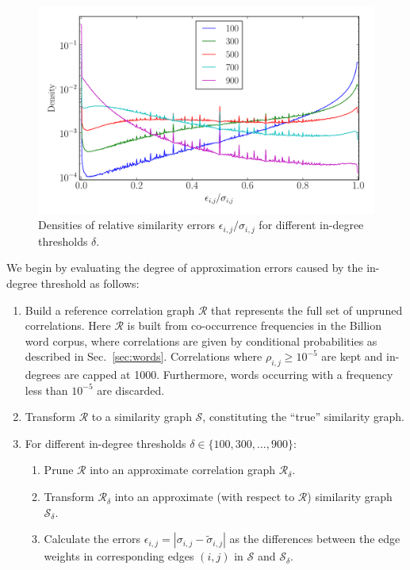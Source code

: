 \documentclass{kais}
\begin{document}
\begin{figure}
\centerline{\includegraphics[width=0.75\columnwidth]{figures/1446451652-relative_error.pdf}}
\caption{Densities of relative similarity errors $\epsilon_{i,j}/\sigma_{i,j}$ for different 
in-degree thresholds $\delta$.}
\label{fig:rel-error}
\end{figure}

We begin by evaluating the degree of approximation errors caused by the in-degree threshold as follows:

\begin{enumerate}
\item Build a reference correlation graph $\mathcal{R}$ that represents the full set of unpruned correlations. 
Here $\mathcal{R}$ is built from co-occurrence frequencies in the Billion word corpus, 
where correlations are given by conditional probabilities as described in Sec.\ \ref{sec:words}.
Correlations where $\rho_{i,j} \geq 10^{-5}$ are kept and in-degrees are capped at 1000.
Furthermore, words occurring with a frequency less than $10^{-5}$ are discarded.
\item Transform $\mathcal{R}$ to a similarity graph $\mathcal{S}$, constituting the ``true'' similarity graph.
\item For different in-degree thresholds $\delta \in \{100, 300, ..., 900\}$:
\begin{enumerate}
\item Prune $\mathcal{R}$ into an approximate correlation graph $\mathcal{R}_{\delta}$.
\item Transform $\mathcal{R}_{\delta}$ into an approximate (with respect to $\mathcal{R}$) similarity 
graph $\mathcal{S}_{\delta}$. 
\item Calculate the errors $\epsilon_{i,j} = |\sigma_{i,j} - \tilde{\sigma}_{i,j}|$ as the differences between
the edge weights in corresponding edges $(i,j)$ in $\mathcal{S}$ and $\mathcal{S}_{\delta}$.
\end{enumerate}
\end{enumerate}
\end{document}
